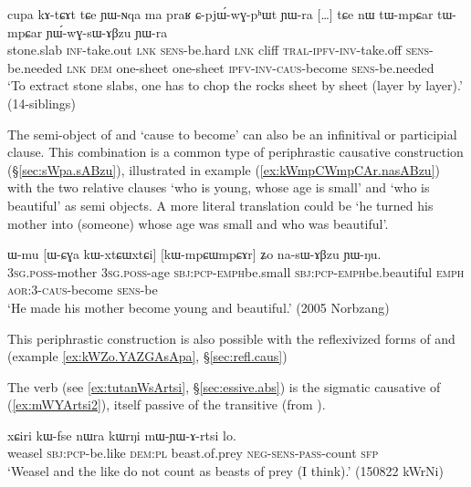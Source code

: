 \begin{exe}
\ex \label{ex:tWmpCar.YWwGGsABzu}
\gll cupa kɤ-tɕɤt tɕe ɲɯ-ɴqa ma praʁ ɕ-pjɯ́-wɣ-pʰɯt ɲɯ-ra […]  tɕe nɯ tɯ-mpɕar tɯ-mpɕar ɲɯ́-wɣ-sɯ-ɤβzu ɲɯ-ra \\
stone.slab \textsc{inf}-take.out \textsc{lnk} \textsc{sens}-be.hard \textsc{lnk} cliff \textsc{tral}-\textsc{ipfv}-\textsc{inv}-take.off \textsc{sens}-be.needed { } 
\textsc{lnk} \textsc{dem} one-sheet one-sheet \textsc{ipfv}-\textsc{inv}-\textsc{caus}-become \textsc{sens}-be.needed \\
\glt `To extract stone slabs, one has to chop the rocks sheet by sheet (layer by layer).’ (14-siblings)
\end{exe} 

The semi-object of   and  `cause to become' can also be an infinitival or participial clause. This combination is a common type of periphrastic causative construction (§\ref{sec:sWpa.sABzu}), illustrated in example (\ref{ex:kWmpCWmpCAr.nasABzu}) with the two relative clauses  `who is young, whose age is small' and  `who is beautiful' as semi objects. A more literal translation could be `he turned his mother into (someone) whose age was small and who was beautiful'.
 
\begin{exe}
\ex \label{ex:kWmpCWmpCAr.nasABzu}
\gll ɯ-mu [ɯ-ɕɣa kɯ-xtɕɯ\redp{}xtɕi] [kɯ-mpɕɯ\redp{}mpɕɤr] ʑo na-sɯ-ɤβzu ɲɯ-ŋu. \\
\textsc{3sg}.\textsc{poss}-mother \textsc{3sg}.\textsc{poss}-age \textsc{sbj}:\textsc{pcp}-\textsc{emph}\redp{}be.small \textsc{sbj}:\textsc{pcp}-\textsc{emph}\redp{}be.beautiful \textsc{emph} \textsc{aor}:3\flobv{}-\textsc{caus}-become \textsc{sens}-be \\
\glt `He made his mother become young and beautiful.' (2005 Norbzang)
\end{exe} 
 
This periphrastic construction is also possible with the reflexivized forms of  and    (example \ref{ex:kWZo.YAZGAsApa}, §\ref{sec:refl.caus})

The verb   (see \ref{ex:tutanWsArtsi}, §\ref{sec:essive.abs}) is the sigmatic causative of  (\ref{ex:mWYArtsi2}), itself passive of the transitive   (from ).

 \begin{exe}
\ex \label{ex:mWYArtsi2}
\gll xɕiri kɯ-fse nɯra kɯrŋi mɯ-ɲɯ-ɤ-rtsi lo. \\
 weasel \textsc{sbj}:\textsc{pcp}-be.like \textsc{dem}:\textsc{pl}  beast.of.prey \textsc{neg}-\textsc{sens}-\textsc{pass}-count \textsc{sfp} \\
\glt `Weasel and the like do not count as beasts of prey (I think).' (150822 kWrNi) 
\end{exe} 

